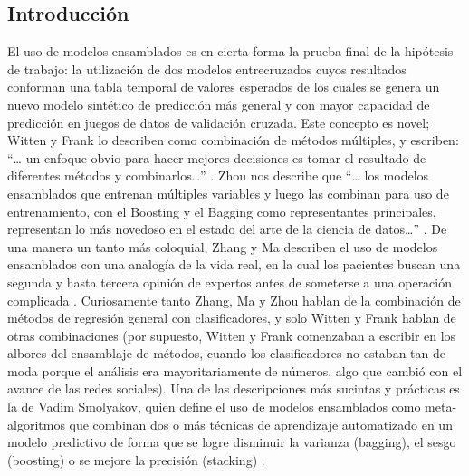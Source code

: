 \begin{spacing}{1.5}
\subsection{Introducción}
  El uso de modelos ensamblados es en cierta forma la prueba final de la hipótesis de trabajo: la utilización de dos modelos entrecruzados cuyos resultados conforman una tabla temporal de valores esperados de los cuales se genera un nuevo modelo sintético de predicción más general y con mayor capacidad de predicción en juegos de datos de validación cruzada. Este concepto es novel; Witten y Frank lo describen como combinación de métodos múltiples, y escriben: “… un enfoque obvio para hacer mejores decisiones es tomar el resultado de diferentes métodos y combinarlos\ldots” \cite{datamining}. Zhou nos describe que “… los modelos ensamblados que entrenan múltiples variables y luego las combinan para uso de entrenamiento, con el Boosting y el Bagging como representantes principales, representan lo más novedoso en el estado del arte de la ciencia de datos…” \cite[p. 7]{ensembleMethods}. De una manera un tanto más coloquial, Zhang y Ma describen el uso de modelos ensamblados con una analogía de la vida real, en la cual los pacientes buscan una segunda y hasta tercera opinión de expertos antes de someterse a una operación complicada \cite{ensembleMachineLearning}. Curiosamente tanto Zhang, Ma y Zhou hablan de la combinación de métodos de regresión general con clasificadores, y solo Witten y Frank hablan de otras combinaciones (por supuesto, Witten y Frank comenzaban a escribir en los albores del ensamblaje de métodos, cuando los clasificadores no estaban tan de moda porque el análisis era mayoritariamente de números, algo que cambió con el avance de las redes sociales). Una de las descripciones más sucintas y prácticas es la de Vadim Smolyakov, quien define el uso de modelos ensamblados como meta-algoritmos que combinan dos o más técnicas de aprendizaje automatizado en un modelo predictivo de forma que se logre disminuir la varianza (bagging), el sesgo (boosting) o se mejore la precisión (stacking) \cite{smolyakov}. 


\end{spacing}
